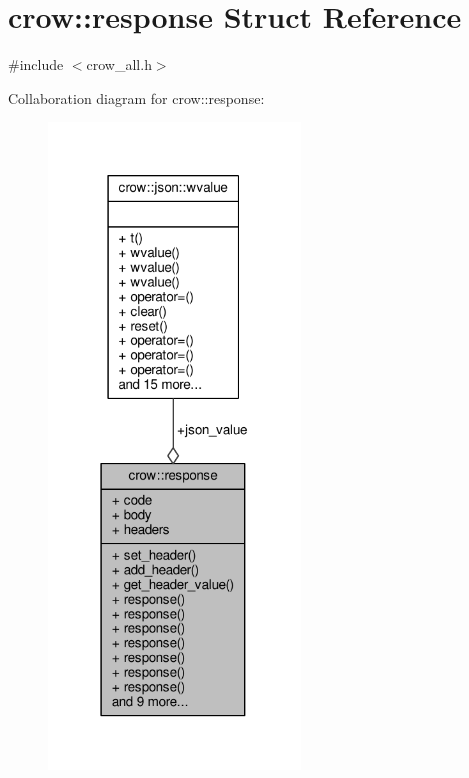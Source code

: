 \hypertarget{structcrow_1_1response}{\section{crow\-:\-:response Struct Reference}
\label{structcrow_1_1response}
}


{\ttfamily \#include $<$crow\-\_\-all.\-h$>$}



Collaboration diagram for crow\-:\-:response\-:
\nopagebreak
\begin{figure}[H]
\begin{center}
\leavevmode
\includegraphics[width=190pt]{structcrow_1_1response__coll__graph}
\end{center}
\end{figure}
